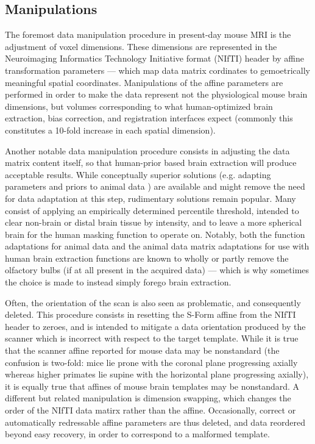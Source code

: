 \subsection{Manipulations}
The foremost data manipulation procedure in present-day mouse MRI is the adjustment of voxel dimensions.
These dimensions are represented in the Neuroimaging Informatics Technology Initiative format (NIfTI) header \cite{nifti} by affine transformation parameters --- which map data matrix cordinates to gemoetrically meaningful spatial coordinates.
Manipulations of the affine parameters are performed in order to make the data represent not the physiological mouse brain dimensions, but volumes corresponding to what human-optimized brain extraction, bias correction, and registration interfaces expect (commonly this constitutes a 10-fold increase in each spatial dimension).

Another notable data manipulation procedure consists in adjusting the data matrix content itself, so that human-prior based brain extraction will produce acceptable results.
While conceptually superior solutions (e.g. adapting parameters and priors to animal data \cite{rbet,Oguz2014}) are available and might remove the need for data adaptation at this step, rudimentary solutions remain popular.
Many consist of applying an empirically determined percentile threshold, intended to clear non-brain or distal brain tissue by intensity, and to leave a more spherical brain for the human masking function to operate on.
Notably, both the function adaptations for animal data and the animal data matrix adaptations for use with human brain extraction functions are known to wholly or partly remove the olfactory bulbs (if at all present in the acquired data) --- which is why sometimes the choice is made to instead simply forego brain extraction.

Often, the orientation of the scan is also seen as problematic, and consequently deleted.
This procedure consists in resetting the S-Form affine from the NIfTI header to zeroes, and is intended to mitigate a data orientation produced by the scanner which is incorrect with respect to the target template.
While it is true that the scanner affine reported for mouse data may be nonstandard (the confusion is two-fold: mice lie prone with the coronal plane progressing axially whereas higher primates lie supine with the horizontal plane progressing axially), it is equally true that affines of mouse brain templates may be nonstandard.
A different but related manipulation is dimension swapping, which changes the order of the NIfTI data matirx rather than the affine.
Occasionally, correct or automatically redressable affine parameters are thus deleted, and data reordered beyond easy recovery, in order to correspond to a malformed template.

